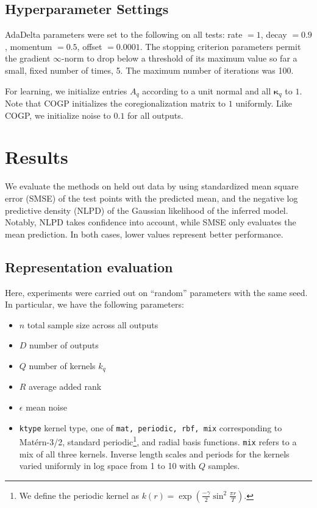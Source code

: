 \documentclass{article}
\def\bsk{{\boldsymbol\kappa}}
\begin{document}
\subsection{Hyperparameter Settings}

AdaDelta parameters were set to the following on all tests: rate $=1$, decay $=0.9$, momentum $=0.5$, offset $=0.0001$. The stopping criterion parameters permit the gradient $\infty$-norm to drop below a threshold of its maximum value so far a small, fixed number of times, 5. The maximum number of iterations was 100.

For learning, we initialize entries $A_q$ according to a unit normal and all $\bsk_q$ to $1$. Note that COGP initializes the coregionalization matrix to $1$ uniformly. Like COGP, we initialize noise to $0.1$ for all outputs.

\section{Results} %
\label{sec:results}
We evaluate the methods on held out data by using standardized mean square error (SMSE) of the test points with the predicted mean, and the negative log predictive density (NLPD) of the Gaussian likelihood of the inferred model. Notably, NLPD takes confidence into account, while SMSE only evaluates the mean prediction. In both cases, lower values represent better performance. 

\subsection{Representation evaluation}\label{empirical-rep}

Here, experiments were carried out on ``random'' parameters with the same seed. %
In particular, we have the following parameters:
\begin{itemize}
\item $n$ total sample size across all outputs
\item $D$ number of outputs
\item $Q$ number of kernels $k_q$
\item $R$ average added rank
\item $\epsilon$ mean noise
\item \texttt{ktype} kernel type, one of \texttt{mat, periodic, rbf, mix} corresponding to Mat\'{e}rn-3/2, standard periodic\footnote{We define the periodic kernel as $k(r) = \exp \left(\frac{-\gamma}{2}\sin^2\frac{\pi r}{T}\right)$.}, and radial basis functions. \texttt{mix} refers to a mix of all three kernels.
Inverse length scales and periods for the kernels varied uniformly in log space from 1 to 10 with $Q$ samples.
\end{itemize}
\end{document}
